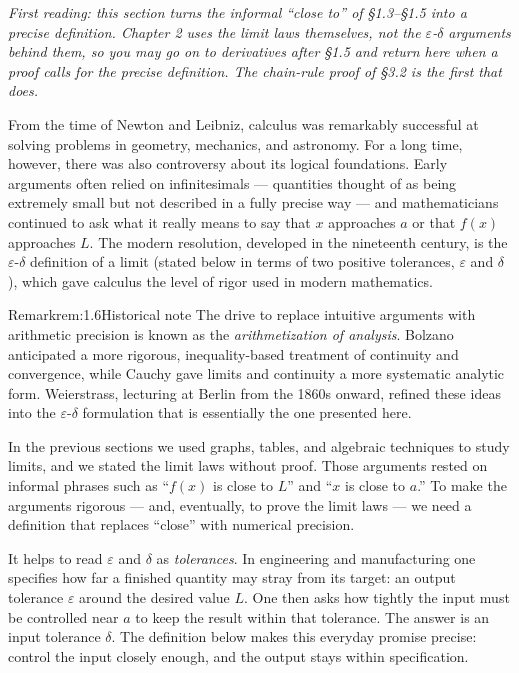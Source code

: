 \documentclass[a4paper,12pt,oneside]{memoir}
\begin{document}
\emph{First reading: this section turns the informal “close to” of §1.3–§1.5 into a precise definition. Chapter 2 uses the limit laws themselves, not the \(\varepsilon\)-\(\delta\) arguments behind them, so you may go on to derivatives after §1.5 and return here when a proof calls for the precise definition. The chain-rule proof of §3.2 is the first that does.}

From the time of Newton and Leibniz, calculus was remarkably successful at solving problems in geometry, mechanics, and astronomy. For a long time, however, there was also controversy about its logical foundations. Early arguments often relied on infinitesimals — quantities thought of as being extremely small but not described in a fully precise way — and mathematicians continued to ask what it really means to say that \(x\) approaches \(a\) or that \(f(x)\) approaches \(L\). The modern resolution, developed in the nineteenth century, is the \(\varepsilon\)-\(\delta\) definition of a limit (stated below in terms of two positive tolerances, \(\varepsilon\) and \(\delta\)), which gave calculus the level of rigor used in modern mathematics.

\begin{envremark}{Remark}{rem:1.6}{Historical note}
The drive to replace intuitive arguments with arithmetic precision is known as the \emph{arithmetization of analysis}. Bolzano anticipated a more rigorous, inequality-based treatment of continuity and convergence, while Cauchy gave limits and continuity a more systematic analytic form. Weierstrass, lecturing at Berlin from the 1860s onward, refined these ideas into the \(\varepsilon\text{-}\delta\) formulation that is essentially the one presented here.
\end{envremark}
In the previous sections we used graphs, tables, and algebraic techniques to study limits, and we stated the limit laws without proof. Those arguments rested on informal phrases such as “\(f(x)\) is close to \(L\)” and “\(x\) is close to \(a\).” To make the arguments rigorous — and, eventually, to prove the limit laws — we need a definition that replaces “close” with numerical precision.

It helps to read \(\varepsilon\) and \(\delta\) as \emph{tolerances}. In engineering and manufacturing one specifies how far a finished quantity may stray from its target: an output tolerance \(\varepsilon\) around the desired value \(L\). One then asks how tightly the input must be controlled near \(a\) to keep the result within that tolerance. The answer is an input tolerance \(\delta\). The definition below makes this everyday promise precise: control the input closely enough, and the output stays within specification.
\end{document}
